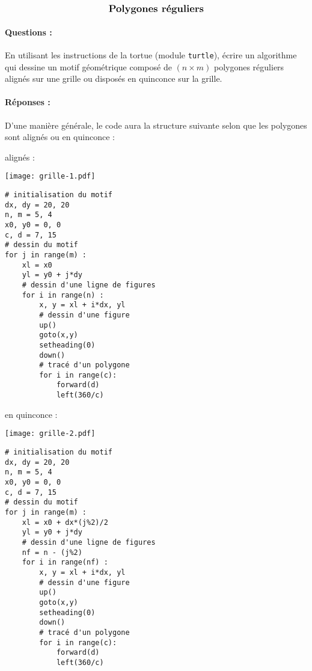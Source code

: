 \documentclass[11pt,a4paper,colorlinks,breaklinks]{article}
\begin{document}
$$\mbox{\textbf{\large Polygones réguliers}}$$


\paragraph{Questions :} 
En utilisant les instructions de la tortue \logo{}
(module \texttt{turtle}), écrire un algorithme qui dessine un motif géométrique
composé de $(n\times m)$ polygones réguliers alignés sur une grille
ou disposés en quinconce sur la grille.

\paragraph{Réponses :} 
D'une manière générale, le code aura la structure suivante selon que 
les polygones sont alignés ou en quinconce :

\noindent
\mbox{}\hfill
\begin{minipage}[t]{6cm}
alignés :\\
\centerline{\texttt{[image: grille-1.pdf]}}

\footnotesize
\begin{Verbatim}[frame=single]
# initialisation du motif
dx, dy = 20, 20
n, m = 5, 4
x0, y0 = 0, 0
c, d = 7, 15 
# dessin du motif
for j in range(m) :
    xl = x0
    yl = y0 + j*dy
    # dessin d'une ligne de figures
    for i in range(n) :
        x, y = xl + i*dx, yl
        # dessin d'une figure
        up()
        goto(x,y)
        setheading(0)
        down()
        # tracé d'un polygone
        for i in range(c):
            forward(d)
            left(360/c)
\end{Verbatim}
\end{minipage}
\hfill
\begin{minipage}[t]{6cm}
en quinconce :\\
\centerline{\texttt{[image: grille-2.pdf]}}

\footnotesize
\begin{Verbatim}[frame=single]
# initialisation du motif
dx, dy = 20, 20
n, m = 5, 4
x0, y0 = 0, 0
c, d = 7, 15
# dessin du motif
for j in range(m) :
    xl = x0 + dx*(j%2)/2
    yl = y0 + j*dy
    # dessin d'une ligne de figures
    nf = n - (j%2)
    for i in range(nf) :
        x, y = xl + i*dx, yl
        # dessin d'une figure
        up()
        goto(x,y)
        setheading(0)
        down()
        # tracé d'un polygone
        for i in range(c):
            forward(d)
            left(360/c)
\end{Verbatim}
\end{minipage}

\end{document}
